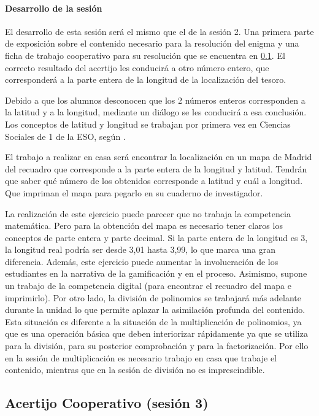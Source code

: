 \paragraph{Desarrollo de la sesión}

El desarrollo de esta sesión será el mismo que el de la sesión 2.
%
Una primera parte de exposición sobre el contenido necesario para la resolución del enigma y una ficha de trabajo cooperativo para su resolución que se encuentra en \ref{app:ses3:coop}.
%
El correcto resultado del acertijo les conducirá a otro número entero, que corresponderá a la parte entera de la longitud de la localización del tesoro.

Debido a que los alumnos desconocen que los 2 números enteros corresponden a la latitud y a la longitud, mediante un diálogo se les conducirá a esa conclusión.
%
Los conceptos de latitud y longitud se trabajan por primera vez en Ciencias Sociales de 1 de la ESO, según \bocm.


El trabajo a realizar en casa será encontrar la localización en un mapa de Madrid del recuadro que corresponde a la parte entera de la longitud y latitud.
%
Tendrán que saber qué número de los obtenidos corresponde a latitud y cuál a longitud.
%
Que impriman el mapa para pegarlo en su cuaderno de investigador.

\Justificacion{}
%
La realización de este ejercicio puede parecer que no trabaja la competencia matemática. 
%
Pero para la obtención del mapa es necesario tener claros los conceptos de parte entera y parte decimal.
%
Si la parte entera de la longitud es 3, la longitud real podría ser desde 3,01 hasta 3,99, lo que marca una gran diferencia.
%
Además, este ejercicio puede aumentar la involucración de los estudiantes en la narrativa de la gamificación y en el proceso.
%
Asimismo, supone un trabajo de la competencia digital (para encontrar el recuadro del mapa e imprimirlo).
%
Por otro lado, la división de polinomios se trabajará más adelante durante la unidad lo que permite aplazar la asimilación profunda del contenido.
%
Esta situación es diferente a la situación de la multiplicación de polinomios, ya que es una operación básica que deben interiorizar rápidamente ya que se utiliza para la división, para su posterior comprobación y para la factorización.
%
Por ello en la sesión de multiplicación es necesario trabajo en casa que trabaje el contenido, mientras que en la sesión de división no es imprescindible.


\subsection{Acertijo Cooperativo (sesión 3)}
\label{app:ses3:coop}


